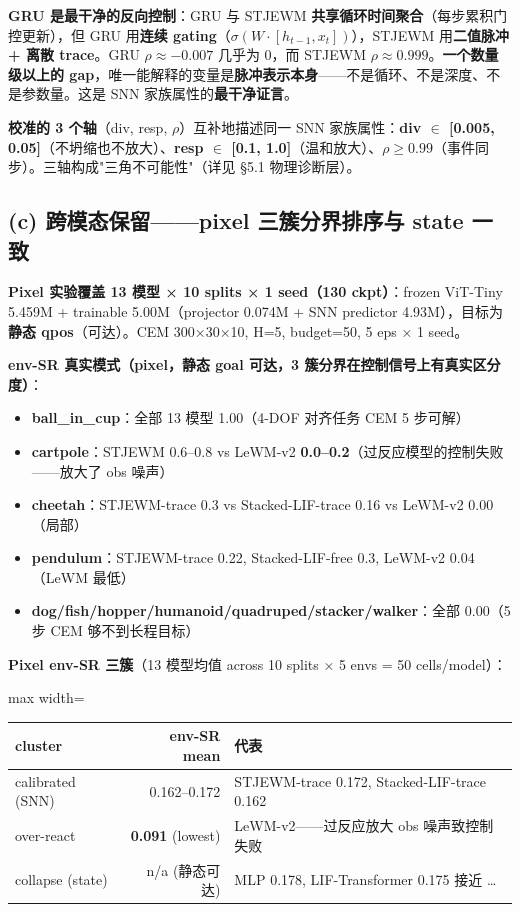 \documentclass[11pt,a4paper]{article}
\begin{document}
\textbf{GRU 是最干净的反向控制}：GRU 与 STJEWM \textbf{共享循环时间聚合}（每步累积门控更新），但 GRU 用\textbf{连续 gating}（$\sigma(W \cdot [h_{t-1}, x_t])$），STJEWM 用\textbf{二值脉冲 + 离散 trace}。GRU $\rho \approx -0.007$ 几乎为 0，而 STJEWM $\rho \approx 0.999$。\textbf{一个数量级以上的 gap}，唯一能解释的变量是\textbf{脉冲表示本身}——不是循环、不是深度、不是参数量。这是 SNN 家族属性的\textbf{最干净证言}。

\textbf{校准的 3 个轴}（div, resp, $\rho$）互补地描述同一 SNN 家族属性：\textbf{div $\in$ [0.005, 0.05]}（不坍缩也不放大）、\textbf{resp $\in$ [0.1, 1.0]}（温和放大）、\textbf{$\rho \geq 0.99$}（事件同步）。三轴构成"三角不可能性"（详见 §5.1 物理诊断层）。

\subsection{(c) 跨模态保留——pixel 三簇分界排序与 state 一致}

\textbf{Pixel 实验覆盖 13 模型 × 10 splits × 1 seed（130 ckpt）}：frozen ViT-Tiny 5.459M + trainable 5.00M（projector 0.074M + SNN predictor 4.93M），目标为\textbf{静态 qpos}（可达）。CEM 300×30×10, H=5, budget=50, 5 eps × 1 seed。

\textbf{env-SR 真实模式（pixel，静态 goal 可达，3 簇分界在控制信号上有真实区分度）}：
\begin{itemize}[leftmargin=2em]
\item \textbf{ball\_in\_cup}：全部 13 模型 1.00（4-DOF 对齐任务 CEM 5 步可解）
\item \textbf{cartpole}：STJEWM 0.6--0.8 vs LeWM-v2 \textbf{0.0--0.2}（过反应模型的控制失败——放大了 obs 噪声）
\item \textbf{cheetah}：STJEWM-trace 0.3 vs Stacked-LIF-trace 0.16 vs LeWM-v2 0.00（局部）
\item \textbf{pendulum}：STJEWM-trace 0.22, Stacked-LIF-free 0.3, LeWM-v2 0.04（LeWM 最低）
\item \textbf{dog/fish/hopper/humanoid/quadruped/stacker/walker}：全部 0.00（5 步 CEM 够不到长程目标）
\end{itemize}

\textbf{Pixel env-SR 三簇}（13 模型均值 across 10 splits × 5 envs = 50 cells/model）：
\begin{adjustbox}{max width=\textwidth}
\scriptsize
\begin{tabular}{lrl}
\toprule
\textbf{cluster} & \textbf{env-SR mean} & \textbf{代表} \\
\midrule
calibrated (SNN) & 0.162--0.172 & STJEWM-trace 0.172, Stacked-LIF-trace 0.162 \\
over-react & \textbf{0.091} (lowest) & LeWM-v2——过反应放大 obs 噪声致控制失败 \\
collapse (state) & n/a (静态可达) & MLP 0.178, LIF-Transformer 0.175 接近 \dots \\
\bottomrule
\end{tabular}
\end{adjustbox}
\end{document}

